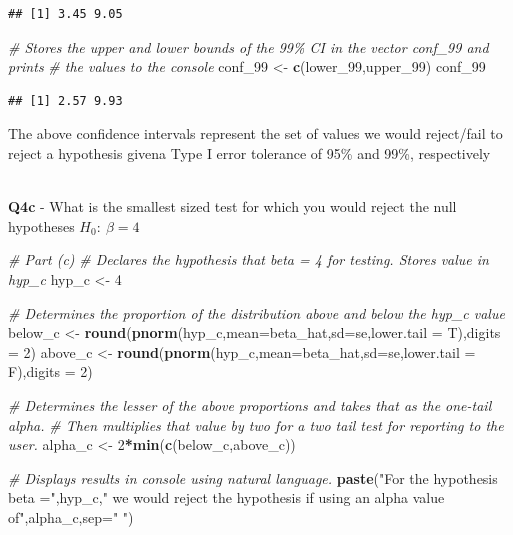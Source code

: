 \documentclass[
]{article}
\newenvironment{Shaded}{\begin{snugshade}}{\end{snugshade}}
\newcommand{\AttributeTok}[1]{\textcolor[rgb]{0.13,0.29,0.53}{#1}}
\newcommand{\CommentTok}[1]{\textcolor[rgb]{0.56,0.35,0.01}{\textit{#1}}}
\newcommand{\DecValTok}[1]{\textcolor[rgb]{0.00,0.00,0.81}{#1}}
\newcommand{\FunctionTok}[1]{\textcolor[rgb]{0.13,0.29,0.53}{\textbf{#1}}}
\newcommand{\NormalTok}[1]{#1}
\newcommand{\OtherTok}[1]{\textcolor[rgb]{0.56,0.35,0.01}{#1}}
\newcommand{\SpecialCharTok}[1]{\textcolor[rgb]{0.81,0.36,0.00}{\textbf{#1}}}
\newcommand{\StringTok}[1]{\textcolor[rgb]{0.31,0.60,0.02}{#1}}
\begin{document}
\begin{verbatim}
## [1] 3.45 9.05
\end{verbatim}

\begin{Shaded}
\begin{Highlighting}[]
\CommentTok{\# Stores the upper and lower bounds of the 99\% CI in the vector \textquotesingle{}conf\_99\textquotesingle{} and prints}
\CommentTok{\# the values to the console}
\NormalTok{conf\_99 }\OtherTok{\textless{}{-}} \FunctionTok{c}\NormalTok{(lower\_99,upper\_99)}
\NormalTok{conf\_99}
\end{Highlighting}
\end{Shaded}

\begin{verbatim}
## [1] 2.57 9.93
\end{verbatim}

\hfill\break
The above confidence intervals represent the set of values we would
reject/fail to reject a hypothesis givena Type I error tolerance of 95\%
and 99\%, respectively\\
\strut \\

\textbf{Q4c} - What is the smallest sized test for which you would
reject the null hypotheses \(H_0: \: \beta=4\)\\

\begin{Shaded}
\begin{Highlighting}[]
\CommentTok{\# Part (c)}
\CommentTok{\# Declares the hypothesis that beta = 4 for testing. Stores value in \textquotesingle{}hyp\_c\textquotesingle{}}
\NormalTok{hyp\_c }\OtherTok{\textless{}{-}} \DecValTok{4}

\CommentTok{\# Determines the proportion of the distribution above and below the hyp\_c value}
\NormalTok{below\_c }\OtherTok{\textless{}{-}} \FunctionTok{round}\NormalTok{(}\FunctionTok{pnorm}\NormalTok{(hyp\_c,}\AttributeTok{mean=}\NormalTok{beta\_hat,}\AttributeTok{sd=}\NormalTok{se,}\AttributeTok{lower.tail =}\NormalTok{ T),}\AttributeTok{digits =} \DecValTok{2}\NormalTok{)}
\NormalTok{above\_c }\OtherTok{\textless{}{-}} \FunctionTok{round}\NormalTok{(}\FunctionTok{pnorm}\NormalTok{(hyp\_c,}\AttributeTok{mean=}\NormalTok{beta\_hat,}\AttributeTok{sd=}\NormalTok{se,}\AttributeTok{lower.tail =}\NormalTok{ F),}\AttributeTok{digits =} \DecValTok{2}\NormalTok{)}

\CommentTok{\# Determines the lesser of the above proportions and takes that as the one{-}tail alpha.}
\CommentTok{\# Then multiplies that value by two for a two tail test for reporting to the user. }
\NormalTok{alpha\_c }\OtherTok{\textless{}{-}} \DecValTok{2}\SpecialCharTok{*}\FunctionTok{min}\NormalTok{(}\FunctionTok{c}\NormalTok{(below\_c,above\_c))}

\CommentTok{\# Displays results in console using natural language.}
\FunctionTok{paste}\NormalTok{(}\StringTok{"For the hypothesis beta ="}\NormalTok{,hyp\_c,}\StringTok{" we would reject the hypothesis if using an alpha value of"}\NormalTok{,alpha\_c,}\AttributeTok{sep=}\StringTok{" "}\NormalTok{)}
\end{Highlighting}
\end{Shaded}
\end{document}
